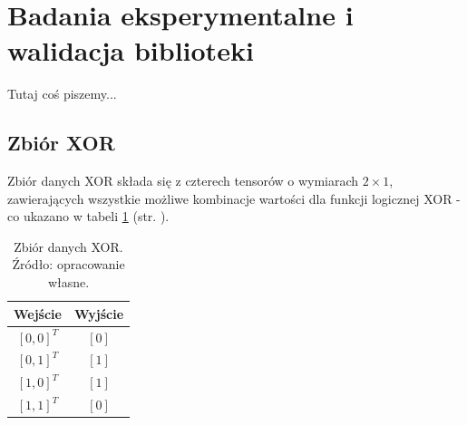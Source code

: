 %
\section{Badania eksperymentalne i walidacja biblioteki}\label{sec:badania}
Tutaj coś piszemy...
\subsection{Zbiór XOR}
Zbiór danych XOR składa się z czterech tensorów o wymiarach
$2 \times 1$, zawierających wszystkie możliwe kombinacje wartości
dla funkcji logicznej XOR - co ukazano w tabeli
\ref{tab:xor-dataset}
(str. \pageref{tab:xor-dataset}).
\begin{table}[H]
	\centering
	\caption{Zbiór danych XOR. Źródło: opracowanie własne.}
	\begin{tabular}{|c|c|}
		\hline
		Wejście      & Wyjście \\
		\hline
		$[0, 0]^{T}$ & $[0]$   \\
		$[0, 1]^{T}$ & $[1]$   \\
		$[1, 0]^{T}$ & $[1]$   \\
		$[1, 1]^{T}$ & $[0]$   \\
		\hline
	\end{tabular}

	\label{tab:xor-dataset}
\end{table}
